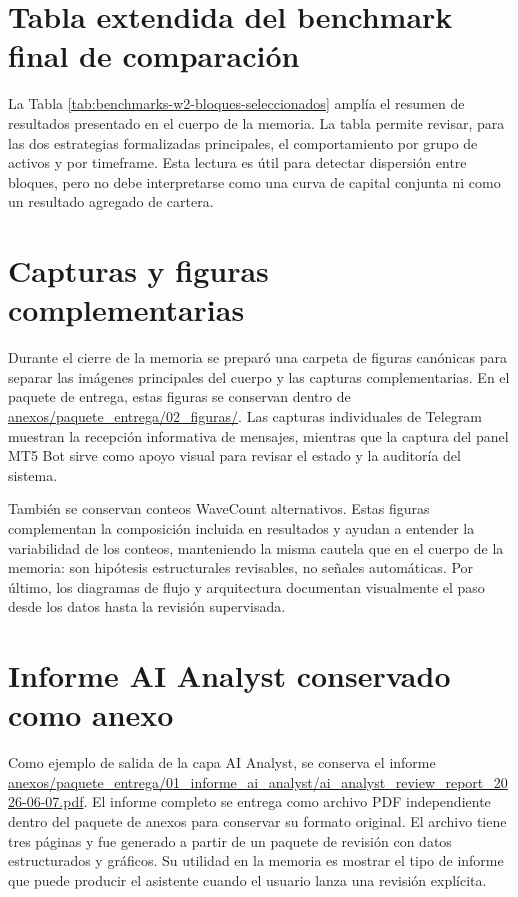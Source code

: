 \section{Tabla extendida del benchmark final de comparaci\'on}
\label{sec:anexos-tabla-extendida-benchmark}

La Tabla \ref{tab:benchmarks-w2-bloques-seleccionados} ampl\'ia el resumen de
resultados presentado en el cuerpo de la memoria. La tabla permite revisar, para
las dos estrategias formalizadas principales, el comportamiento por grupo de
activos y por timeframe. Esta lectura es \'util para detectar dispersi\'on entre
bloques, pero no debe interpretarse como una curva de capital conjunta ni como
un resultado agregado de cartera.



\section{Capturas y figuras complementarias}
\label{sec:anexos-capturas-figuras}

Durante el cierre de la memoria se prepar\'o una carpeta de figuras can\'onicas
para separar las im\'agenes principales del cuerpo y las capturas
complementarias. En el paquete de entrega, estas figuras se conservan dentro de
\url{anexos/paquete_entrega/02_figuras/}. Las capturas individuales de Telegram
muestran la recepci\'on informativa de mensajes, mientras que la captura del
panel MT5 Bot sirve como apoyo visual para revisar el estado y la auditor\'ia del
sistema.

Tambi\'en se conservan conteos WaveCount alternativos. Estas figuras complementan
la composici\'on incluida en resultados y ayudan a entender la variabilidad de
los conteos, manteniendo la misma cautela que en el cuerpo de la memoria: son
hip\'otesis estructurales revisables, no se\~nales autom\'aticas. Por \'ultimo, los
diagramas de flujo y arquitectura documentan visualmente el paso desde los datos
hasta la revisi\'on supervisada.

\section{Informe AI Analyst conservado como anexo}
\label{sec:anexos-informe-ai-analyst}

Como ejemplo de salida de la capa AI Analyst, se conserva el informe
\url{anexos/paquete_entrega/01_informe_ai_analyst/ai_analyst_review_report_2026-06-07.pdf}.
El informe completo se entrega como archivo PDF independiente dentro del
paquete de anexos para conservar su formato original. El archivo tiene tres
p\'aginas y fue generado a partir de un paquete de revisi\'on con datos
estructurados y gr\'aficos. Su utilidad en la memoria es mostrar el tipo de
informe que puede producir el asistente cuando el usuario lanza una revisi\'on
expl\'icita.

